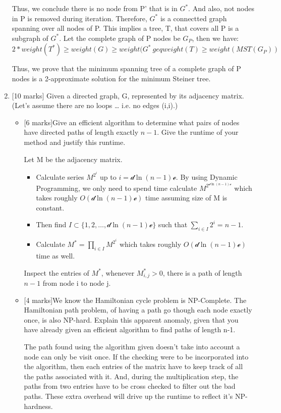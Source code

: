 \documentclass[12pt]{article}
\begin{document}
\begin{enumerate}
Thus, we conclude there is no node from P' that is in $G^{*}$. And also, not nodes in P is removed during iteration. Therefore, $G^{*}$ is a connectted graph spanning over all nodes of P. This implies a tree, T, that covers all P is a subgraph of $G^{*}$. Let the complete graph of P nodes be $G_{P}$, then we have:
\begin{equation}
2 * weight(T^{*}) \geq weight(G) \geq weight(G^{*} \ geq weight(T) \geq weight(MST(G_{P}))
\end{equation}

Thus, we prove that the minimum spanning tree of a complete graph of P nodes is a 2-approximate solution for the minimum Steiner tree.

\item{} [10 marks]
Given a directed graph, G, represented by its adjacency matrix. (Let’s assume there are no loops … i.e. no edges (i,i).)
\begin{itemize}
\item{}[6 marks]Give an efficient algorithm to determine what pairs of nodes have directed paths of length exactly $n-1$. Give the runtime of your method and justify this runtime.

Let M be the adjacency matrix.
\begin{itemize}
\item Calculate series $M^{2^{i}}$ up to $i = \mathcal{d} \ln{(n-1)} \mathcal{e}$. By using Dynamic Programming, we only need to spend time calculate $M^{2^{\mathcal{d} \ln{(n-1)} \mathcal{e}}}$ which takes roughly $O(\mathcal{d} \ln{(n-1)} \mathcal{e})$ time assuming size of M is constant.
\item Then find $I \subset \{1, 2, \ldots, \mathcal{d} \ln{(n-1)} \mathcal{e}\}$ such that $\sum_{i \in I}{2^{i}} = n-1$.
\item Calculate $M^{*} = \prod_{i \in I}{M^{2^{i}}}$ which takes roughly $O(\mathcal{d} \ln{(n-1)} \mathcal{e})$ time as well.
\end{itemize}
 Inspect the entries of $M^{*}$, whenever $M^{*}_{i,j} > 0$, there is a path of length $n-1$ from node i to node j.

\item{}[4 marks]We know the Hamiltonian cycle problem is NP-Complete. The Hamiltonian path problem, of having a path go though each node exactly once, is also NP-hard. Explain this apparent anomaly, given that you have already given an efficient algorithm to find paths of length n-1.

The path found using the algorithm given doesn't take into account a node can only be visit once. If the checking were to be incorporated into the algorithm, then each entries of the matrix have to keep track of all the paths associated with it. And, during the multiplication step, the paths from two entries have to be cross checked to filter out the bad paths. These extra overhead will drive up the runtime to reflect it's NP-hardness.
\end{itemize}


\end{enumerate}
\end{document}
